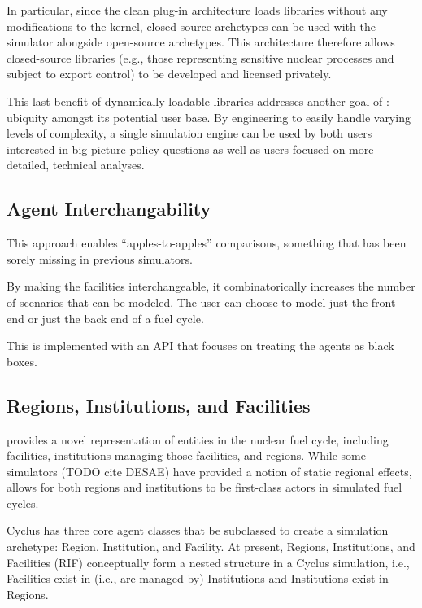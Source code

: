 In particular, since the clean plug-in architecture loads libraries without any
modifications to the \Cyclus kernel, closed-source archetypes can be used with
the simulator alongside open-source archetypes. This architecture therefore
allows closed-source libraries (e.g., those representing sensitive nuclear
processes and subject to export control) to be developed and licensed privately.

This last benefit of dynamically-loadable libraries addresses
another goal of \Cyclus: ubiquity amongst its potential user base. By
engineering \Cyclus to easily handle varying levels of complexity, a single
simulation engine can be used by both users interested in big-picture policy
questions as well as users focused on more detailed, technical
analyses.


\subsection{Agent Interchangability}

This approach enables ``apples-to-apples'' comparisons, something that has been 
sorely missing in previous simulators.

By making the facilities interchangeable, it combinatorically increases the 
number of scenarios that can be modeled. The user can choose to model just the 
front end or just the back end of a fuel cycle. 

This is implemented with an API that focuses on treating the agents as black 
boxes. 

\subsection{Regions, Institutions, and Facilities}

\Cyclus provides a novel representation of entities in the nuclear fuel cycle,
including facilities, institutions managing those facilities, and regions. While
some simulators (TODO cite DESAE) have provided a notion of static regional
effects, \Cyclus allows for both regions and institutions to be first-class
actors in simulated fuel cycles.

Cyclus has three core agent classes that be subclassed to create a simulation
archetype: Region, Institution, and Facility. At present, Regions, Institutions,
and Facilities (RIF) conceptually form a nested structure in a Cyclus simulation,
i.e., Facilities exist in (i.e., are managed by) Institutions and Institutions
exist in Regions.

